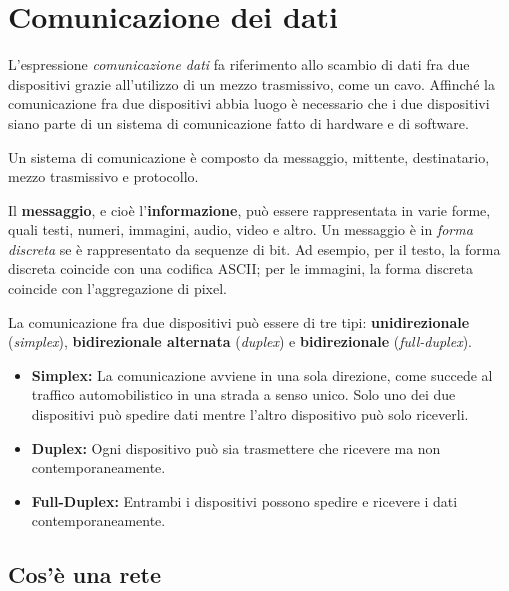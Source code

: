 \section{Comunicazione dei dati}
    L’espressione \textit{comunicazione dati} fa riferimento allo scambio di dati fra due
    dispositivi grazie all’utilizzo di un mezzo trasmissivo, come un cavo. Affinché la comunicazione fra due dispositivi abbia luogo è necessario che i due dispositivi siano parte di un sistema di comunicazione fatto di hardware e di software.

    \vspace{3mm}
    
    Un sistema di comunicazione è composto da messaggio, mittente, destinatario, mezzo trasmissivo e protocollo.
    
    \vspace{3mm}
    
    Il \textbf{messaggio}, e cioè l'\textbf{informazione}, può essere rappresentata in varie forme, quali testi, numeri, immagini, audio, video e altro. Un messaggio è in \textit{forma discreta} se è rappresentato da sequenze di bit. Ad esempio, per il testo, la forma discreta coincide con una codifica ASCII; per le immagini, la forma discreta coincide con l'aggregazione di pixel.
    
    \vspace{3mm}
    
    La comunicazione fra due dispositivi può essere di tre tipi: \textbf{unidirezionale} (\textit{simplex}), \textbf{bidirezionale alternata} (\textit{duplex}) e \textbf{bidirezionale} (\textit{full-duplex}).
    
    \begin{itemize}
        \item 
        \textbf{Simplex:} La comunicazione avviene in una sola direzione, come succede al traffico automobilistico in una strada a senso unico. Solo uno dei due dispositivi può spedire dati mentre l’altro dispositivo può solo riceverli.
    
        \item
        \textbf{Duplex:} Ogni dispositivo può sia trasmettere che ricevere ma non contemporaneamente.
        
        \item
        \textbf{Full-Duplex:} Entrambi i dispositivi possono spedire e ricevere i dati contemporaneamente.
    \end{itemize}
    
    \subsection{Cos'è una rete}
    
